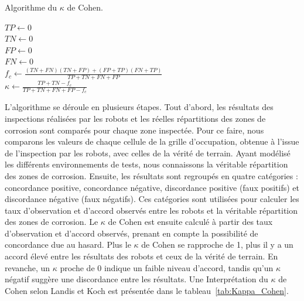 \documentclass[francais,RandD]{rapportPFE}
\begin{document}
			\begin{algorithm}[h!]
				\caption{Algorithme du $\kappa$ de Cohen.}
				\label{alg:Cohen_Kappa}
				\KwResult{$\kappa \in [0, 1]$}
				$TP \gets 0$ \\
				$TN \gets 0$ \\
				$FP \gets 0$ \\
				$FN \gets 0$ \\
				$f_c \gets \frac{(TN + FN) (TN + FP) + (FP + TP) (FN + TP)}{TP + TN + FN +FP}$ \\
				$\kappa \gets \frac{TP + TN - f_c}{TP + TN + FN + FP - f_c}$
			\end{algorithm}

			L'algorithme se déroule en plusieurs étapes.
			Tout d'abord, les résultats des inspections réalisées par les robots et les réelles répartitions des zones de corrosion sont comparés pour chaque zone inspectée.
			Pour ce faire, nous comparons les valeurs de chaque cellule de la grille d'occupation, obtenue à l'issue de l'inspection par les robots, avec celles de la vérité de terrain.
			Ayant modélisé les différents environnements de tests, nous connaissons la véritable répartition des zones de corrosion.
			Ensuite, les résultats sont regroupés en quatre catégories : concordance positive, concordance négative, discordance positive (faux positifs) et discordance négative (faux négatifs).
			Ces catégories sont utilisées pour calculer les taux d'observation et d'accord observés entre les robots et la véritable répartition des zones de corrosion.
			Le $\kappa$ de Cohen est ensuite calculé à partir des taux d'observation et d'accord observés, prenant en compte la possibilité de concordance due au hasard.
			Plus le $\kappa$ de Cohen se rapproche de 1, plus il y a un accord élevé entre les résultats des robots et ceux de la vérité de terrain.
			En revanche, un $\kappa$ proche de 0 indique un faible niveau d'accord, tandis qu'un $\kappa$ négatif suggère une discordance entre les résultats.
			Une Interprétation du $\kappa$ de Cohen selon Landis et Koch est présentée dans le tableau~\ref{tab:Kappa_Cohen}.
\end{document}
